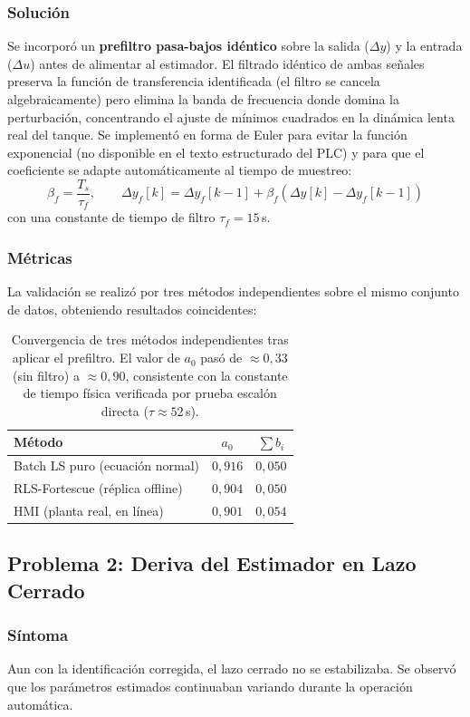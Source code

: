 \subsubsection{Solución}
Se incorporó un \textbf{prefiltro pasa-bajos idéntico} sobre la salida ($\Delta y$) y la entrada ($\Delta u$) antes de alimentar al estimador. El filtrado idéntico de ambas señales preserva la función de transferencia identificada (el filtro se cancela algebraicamente) pero elimina la banda de frecuencia donde domina la perturbación, concentrando el ajuste de mínimos cuadrados en la dinámica lenta real del tanque. Se implementó en forma de Euler para evitar la función exponencial (no disponible en el texto estructurado del PLC) y para que el coeficiente se adapte automáticamente al tiempo de muestreo:
\[
\beta_f = \frac{T_s}{\tau_f}, \qquad \Delta y_f[k] = \Delta y_f[k-1] + \beta_f\left(\Delta y[k] - \Delta y_f[k-1]\right)
\]
con una constante de tiempo de filtro $\tau_f = 15\,$s.

\subsubsection{Métricas}
La validación se realizó por tres métodos independientes sobre el mismo conjunto de datos, obteniendo resultados coincidentes:

\begin{table}[H]
\centering
\begin{tabular}{lcc}
\toprule
\textbf{Método} & $a_0$ & $\sum b_i$ \\
\midrule
Batch LS puro (ecuación normal) & $0{,}916$ & $0{,}050$ \\
RLS-Fortescue (réplica offline) & $0{,}904$ & $0{,}050$ \\
HMI (planta real, en línea) & $0{,}901$ & $0{,}054$ \\
\bottomrule
\end{tabular}
\caption{Convergencia de tres métodos independientes tras aplicar el prefiltro. El valor de $a_0$ pasó de $\approx 0{,}33$ (sin filtro) a $\approx 0{,}90$, consistente con la constante de tiempo física verificada por prueba escalón directa ($\tau \approx 52\,$s).}
\end{table}

\subsection{Problema 2: Deriva del Estimador en Lazo Cerrado}

\subsubsection{Síntoma}
Aun con la identificación corregida, el lazo cerrado no se estabilizaba. Se observó que los parámetros estimados continuaban variando durante la operación automática.

